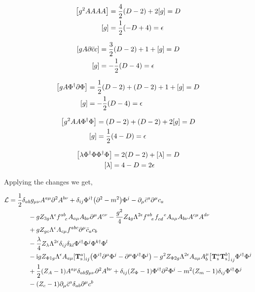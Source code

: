 \begin{align}
    \qty[g^2AAAA]&=\frac42\qty(D-2)+2\qty[g]=D\nonumber\\
    \qty[g]&=\frac12\qty(-D+4)=\epsilon
\end{align}

\begin{align}
    \qty[gA\partial\bar cc]&=\frac32\qty(D-2)+1+\qty[g]=D\nonumber\\
    \qty[g]&=-\frac12\qty(D-4)=\epsilon
\end{align}

\begin{align}
    \qty[gA\Phi^\dagger\partial\Phi]&=\frac12\qty(D-2)+\qty(D-2)+1+\qty[g]=D\nonumber\\
    \qty[g]&=-\frac12\qty(D-4)=\epsilon
\end{align}

\begin{align}
    \qty[g^2AA\Phi^\dagger\Phi]&=\qty(D-2)+\qty(D-2)+2\qty[g]=D\nonumber\\
    \qty[g]&=\frac12\qty(4-D)=\epsilon
\end{align}

\begin{align}
    \qty[\lambda\Phi^\dagger\Phi\Phi^\dagger\Phi]&=2\qty(D-2)+\qty[\lambda]=D\nonumber\\
    \qty[\lambda]&=4-D=2\epsilon
\end{align}

Applying the changes we get,

\begin{align}
    \mathcal L&=\frac12\delta_{ab}g_{\mu\nu}A^{a\mu}\partial^2A^{b\nu}+\delta_{ij}\Phi^{i\dagger}\qty(\partial^2-m^2)\Phi^j-\partial_\mu\bar c^a\partial^\mu c_a\nonumber\\
    &\quad\quad\quad-gZ_{3g}\Lambda^\epsilon\tensor{f}{^a^b_c}A_{a\mu}A_{b\nu}\partial^\mu A^{c\nu}-\frac{g^2}{4}Z_{4g}\Lambda^{2\epsilon}\tensor{f}{^a^b_e}\tensor{f}{_c_d^e}A_{a\mu}A_{b\nu}A^{c\mu}A^{d\nu}\nonumber\\
    &\quad\quad\quad +g Z_{gc}\Lambda^\epsilon A_{c\mu}\tensor{f}{^a^b^c}\partial^\mu \bar c_ac_b\nonumber\\
    &\quad\quad\quad-\frac\lambda4Z_\lambda\Lambda^{2\epsilon}\delta_{ij}\delta_{kl}\Phi^{i\dagger}\Phi^{j}\Phi^{k\dagger}\Phi^{l}\nonumber\\
    &\quad\quad\quad
    -\im gZ_{\Phi 1g}\Lambda^{\epsilon}A_{a\mu}\tensor{\qty[\vb T^{a}_{\textnormal s}]}{_i_j}\qty(\Phi^{i\dagger}\partial^\mu\Phi^j-\partial^\mu\Phi^{i\dagger}\Phi^j)
    -g^2Z_{\Phi 2g}\Lambda^{2\epsilon}A_{a\mu}A_b^\mu
    \tensor{\qty[\vb T^{a}_{\textnormal s}\vb T^b_{\textnormal s}]}{_i_j}
    \Phi^{i\dagger}\Phi^j\nonumber\\
    &\quad\quad\quad+\frac12\qty(Z_A-1)A^{a\mu}\delta_{ab}g_{\mu\nu}\partial^2A^{b\nu}+\delta_{ij}\qty(Z_\Phi-1)\Phi^{i\dagger}\partial^2\Phi^j-m^2\qty(Z_m-1)\delta_{ij}\Phi^{i\dagger}\Phi^j\nonumber\\
    &\quad\quad\quad-\qty(Z_c-1)\partial_\mu \bar c^a\delta_{ab}\partial^\mu c^b\nonumber
\end{align}

